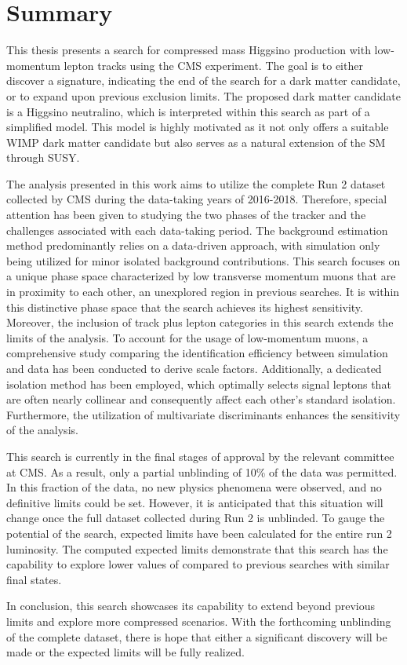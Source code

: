 \chapter{Summary}
\label{sec:summary}

This thesis presents a search for compressed mass Higgsino production with low-momentum lepton tracks using the CMS experiment. The goal is to either discover a signature, indicating the end of the search for a dark matter candidate, or to expand upon previous exclusion limits. The proposed dark matter candidate is a Higgsino neutralino, which is interpreted within this search as part of a simplified model. This model is highly motivated as it not only offers a suitable WIMP dark matter candidate but also serves as a natural extension of the SM through SUSY.

The analysis presented in this work aims to utilize the complete Run 2 dataset collected by CMS during the data-taking years of 2016-2018. Therefore, special attention has been given to studying the two phases of the tracker and the challenges associated with each data-taking period. The background estimation method predominantly relies on a data-driven approach, with simulation only being utilized for minor isolated background contributions. This search focuses on a unique phase space characterized by low transverse momentum muons that are in proximity to each other, an unexplored region in previous searches. It is within this distinctive phase space that the search achieves its highest sensitivity. Moreover, the inclusion of track plus lepton categories in this search extends the limits of the analysis. To account for the usage of low-momentum muons, a comprehensive study comparing the identification efficiency between simulation and data has been conducted to derive scale factors. Additionally, a dedicated isolation method has been employed, which optimally selects signal leptons that are often nearly collinear and consequently affect each other's standard isolation. Furthermore, the utilization of multivariate discriminants enhances the sensitivity of the analysis.

This search is currently in the final stages of approval by the relevant committee at CMS. As a result, only a partial unblinding of 10\% of the data was permitted. In this fraction of the data, no new physics phenomena were observed, and no definitive limits could be set. However, it is anticipated that this situation will change once the full dataset collected during Run 2 is unblinded. To gauge the potential of the search, expected limits have been calculated for the entire run 2 luminosity. The computed expected limits demonstrate that this search has the capability to explore lower values of \dm compared to previous searches with similar final states.

In conclusion, this search showcases its capability to extend beyond previous limits and explore more compressed scenarios. With the forthcoming unblinding of the complete dataset, there is hope that either a significant discovery will be made or the expected limits will be fully realized.